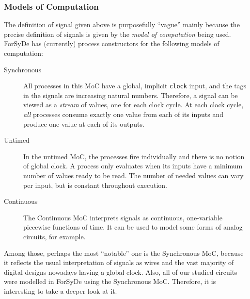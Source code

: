\documentclass[a4paper]{article}
\begin{document}
            \subsubsection{Models of Computation}
            \label{subsubsec:forsyde-mocs}
                The definition of signal given above is purposefully ``vague'' mainly because the
                precise definition of signals is given by the \emph{model of computation} being
                used. ForSyDe has (currently) process constructors for the following models of
                computation:
                \begin{description}
                    \item[Synchronous] All processes in this MoC have a global, implicit
                        \texttt{clock} input, and the tags in the signals are increasing natural
                        numbers. Therefore, a signal can be viewed as a \emph{stream} of values, one
                        for each clock cycle. At each clock cycle, \emph{all} processes consume
                        exactly one value from each of its inputs and produce one value at each of
                        its outputs.

                    \item[Untimed] In the untimed MoC, the processes fire individually and there is
                        no notion of global clock. A process only evaluates when its inputs have a
                        minimum number of values ready to be read. The number of needed values can
                        vary per input, but is constant throughout execution.

                    \item[Continuous] The Continuous MoC interprets signals as continuous,
                        one-variable piecewise functions of time. It can be used to model some forms
                        of analog circuits, for example.
                \end{description}

                Among those, perhaps the most ``notable'' one is the Synchronous MoC, because it
                reflects the usual interpretation of signals as wires and the vast majority of
                digital designs nowadays having a global clock. Also, all of our studied circuits
                were modelled in ForSyDe using the Synchronous MoC. Therefore, it is interesting to
                take a deeper look at it.
\end{document}
